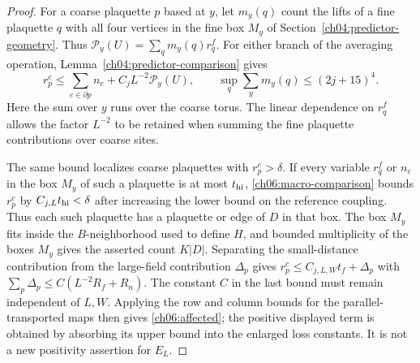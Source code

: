 \begin{proof}
For a coarse plaquette $p$ based at $y$, let $m_y(q)$ count the lifts
of a fine plaquette $q$ with all four vertices in the fine box $M_y$ of
Section~\ref{ch04:predictor-geometry}. Thus
$\mathcal P_y(U)=\sum_qm_y(q)r_q^f$. For either branch of the averaging operation,
Lemma~\ref{ch04:predictor-comparison} gives
\begin{equation}
 r_p^c\le\sum_{e\in\partial p}n_e+C_jL^{-2}\mathcal P_y(U),
 \qquad \sup_q\sum_ym_y(q)\le(2j+15)^4 .
 \label{ch06:macro-comparison}
\end{equation}
Here the sum over $y$ runs over the coarse torus. The linear dependence
on $r_q^f$ allows the factor $L^{-2}$ to be retained when summing the
fine plaquette contributions over coarse sites.

The same bound localizes coarse plaquettes with $r_p^c>\delta$.
If every variable $r_q^f$ or $n_e$ in the box $M_y$ of such a plaquette is at most
$t_{\rm hi}$, \eqref{ch06:macro-comparison} bounds $r_p^c$ by
$C_{j,L}t_{\rm hi}<\delta$ after increasing the lower bound on the reference coupling.
Thus each such plaquette has a plaquette or edge of $D$ in that box. The box
$M_y$ fits inside the $B$-neighborhood used to define $H$, and bounded
multiplicity of the boxes $M_y$ gives the asserted count $K|D|$.
Separating the small-distance contribution from the large-field contribution $\Delta_p$ gives
$r_p^c\le C_{j,L,W}t_f+\Delta_p$ with
$\sum_p\Delta_p\le C(L^{-2}R_f+R_n)$.
The constant $C$ in the last bound must remain independent of $L,W$.
Applying the row and column bounds for the parallel-transported maps then gives
\eqref{ch06:affected}; the positive displayed term is obtained by absorbing
its upper bound into the enlarged loss constants. It is not a new
positivity assertion for $E_L$.


\end{proof}
